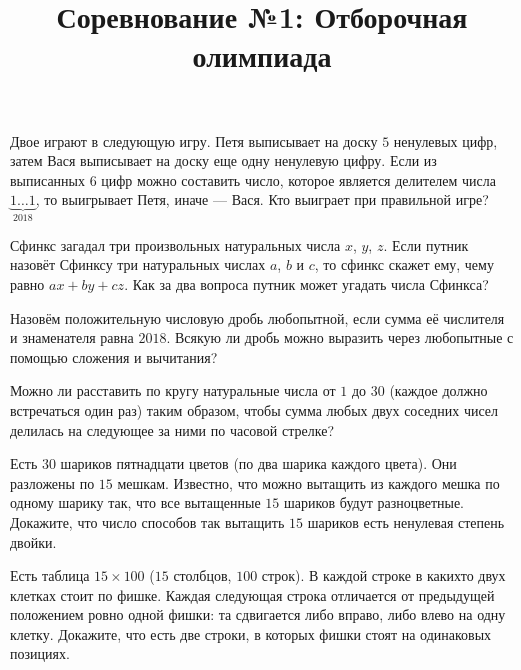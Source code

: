 



\title{Соревнование №1: Отборочная олимпиада}
\maketitle

\begin{problem}
	Двое играют в следующую игру. Петя выписывает на доску $5$ ненулевых цифр, затем Вася выписывает на доску еще одну ненулевую цифру. Если из выписанных $6$ цифр можно составить число, которое является делителем числа $\underset{2018}{\underbrace{1\ldots1}}$, то выигрывает Петя, иначе --- Вася. Кто выиграет при правильной игре?
\end{problem}

\begin{problem}
	Сфинкс загадал три произвольных натуральных числа $x$, $y$, $z$. Если путник назовёт Сфинксу три натуральных числах $a$, $b$ и $c$, то сфинкс скажет ему, чему равно $ax + by + cz$. Как за два вопроса путник может угадать числа Сфинкса?
\end{problem}

\begin{problem}
	Назовём положительную числовую дробь любопытной, если сумма её числителя и знаменателя равна $2018$. Всякую ли дробь можно выразить через любопытные с помощью сложения и вычитания?
\end{problem}

\begin{problem}
	Можно ли расставить по кругу натуральные числа от $1$ до $30$ (каждое должно встречаться один раз) таким образом, чтобы сумма любых двух соседних чисел делилась на следующее за ними по часовой стрелке?
\end{problem}

\begin{problem}
	Есть $30$ шариков пятнадцати цветов (по два шарика каждого цвета). Они разложены по $15$ мешкам. Известно, что можно вытащить из каждого мешка по одному шарику так, что все вытащенные $15$ шариков будут разноцветные. Докажите, что число способов так вытащить $15$ шариков есть ненулевая степень двойки.
\end{problem}

\begin{problem}
	Есть таблица $15 \times 100$ ($15$ столбцов, $100$ строк). В каждой строке в какихто двух клетках стоит по фишке. Каждая следующая строка отличается от предыдущей положением ровно одной фишки: та сдвигается либо вправо, либо влево на одну клетку. Докажите, что есть две строки, в которых фишки стоят на одинаковых позициях.
\end{problem}

